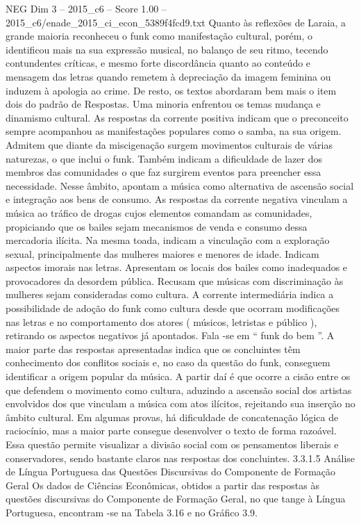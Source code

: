 \begin{textsample}{NEG Dim 3 – 2015\_c6 – Score 1.00 – 2015\_c6/enade\_2015\_ci\_econ\_5389f4fcd9.txt}
Quanto às reflexões de Laraia, a grande maioria reconheceu o funk como manifestação cultural, porém, o identificou mais na sua expressão musical, no balanço de seu ritmo, tecendo contundentes críticas, e mesmo forte discordância quanto ao conteúdo e mensagem das letras quando remetem à depreciação da imagem feminina ou induzem à apologia ao crime.
De resto, os textos abordaram bem mais o item dois do padrão de Respostas.
Uma minoria enfrentou os temas mudança e dinamismo cultural.
As respostas da corrente positiva indicam que o preconceito sempre acompanhou as manifestações populares como o samba, na sua origem.
Admitem que diante da miscigenação surgem movimentos culturais de várias naturezas, o que inclui o funk.
Também indicam a dificuldade de lazer dos membros das comunidades o que faz surgirem eventos para preencher essa necessidade.
Nesse âmbito, apontam a música como alternativa de ascensão social e integração aos bens de consumo.
As respostas da corrente negativa vinculam a música ao tráfico de drogas cujos elementos comandam as comunidades, propiciando que os bailes sejam mecanismos de venda e consumo dessa mercadoria ilícita.
Na mesma toada, indicam a vinculação com a exploração sexual, principalmente das mulheres maiores e menores de idade.
Indicam aspectos imorais nas letras.
Apresentam os locais dos bailes como inadequados e provocadores da desordem pública.
Recusam que músicas com discriminação às mulheres sejam consideradas como cultura.
A corrente intermediária indica a possibilidade de adoção do funk como cultura desde que ocorram modificações nas letras e no comportamento dos atores ( músicos, letristas e público ), retirando os aspectos negativos já apontados.
Fala -se em “ funk do bem ”.
A maior parte das respostas apresentadas indica que os concluintes têm conhecimento dos conflitos sociais e, no caso da questão do funk, conseguem identificar a origem popular da música.
A partir daí é que ocorre a cisão entre os que defendem o movimento como cultura, aduzindo a ascensão social dos artistas envolvidos dos que vinculam a música com atos ilícitos, rejeitando sua inserção no âmbito cultural.
Em algumas provas, há dificuldade de concatenação lógica de raciocínio, mas a maior parte consegue desenvolver o texto de forma razoável.
Essa questão permite visualizar a divisão social com os pensamentos liberais e conservadores, sendo bastante claros nas respostas dos concluintes. 3.3.1.5 Análise de Língua Portuguesa das Questões Discursivas do Componente de Formação Geral Os dados de Ciências Econômicas, obtidos a partir das respostas às questões discursivas do Componente de Formação Geral, no que tange à Língua Portuguesa, encontram -se na Tabela 3.16 e no Gráfico 3.9.

\end{textsample}
